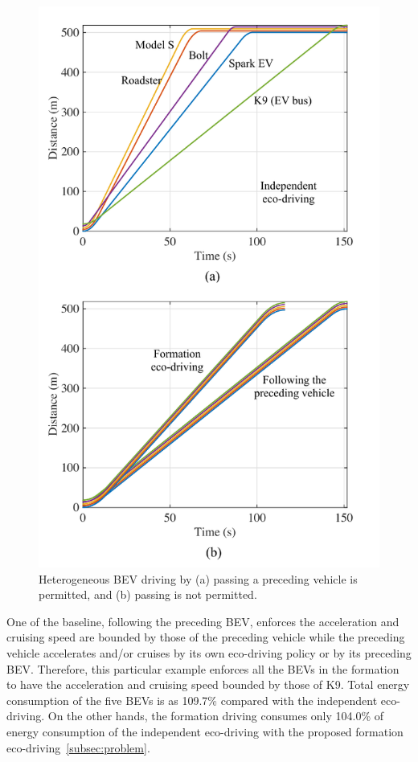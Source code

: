 \documentclass{IEEEtran}
\begin{document}
\begin{figure}	%
\centering
\includegraphics[width=0.9\hsize]{Figures/Heterogeneous_driving.pdf}
\caption{Heterogeneous BEV driving by (a) passing a preceding vehicle is permitted, and (b) passing is not permitted.}
\label{fig:hetero_driving}
\end{figure} 


One of the baseline, following the preceding BEV, enforces the acceleration and cruising speed are bounded by those of the preceding vehicle while the preceding vehicle accelerates and/or cruises by its own eco-driving policy or by its preceding BEV. Therefore, this particular example enforces all the BEVs in the formation to have the acceleration and cruising speed bounded by those of K9. Total energy consumption of the five BEVs is as 109.7\% compared with the independent eco-driving.
On the other hands, the formation driving consumes only 104.0\% of energy consumption of the independent eco-driving with the proposed formation eco-driving~\ref{subsec:problem}.
\end{document}
